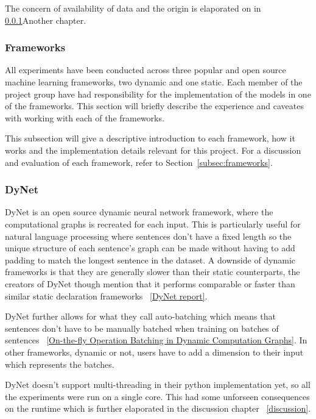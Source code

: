 The concern of availability of data and the origin is elaporated on in
\ref{}{Another chapter}.


\subsubsection{Frameworks}

All experiments have been conducted across three popular and open source machine
learning frameworks, two dynamic and one static. Each member of the project
group have had responsibility for the implementation of the models in one of the
frameworks. This section will briefly describe the experience and caveates with
working with each of the frameworks.

This subsection will give a descriptive introduction to each framework, how it
works and the implementation details relevant for this project. For a discussion
and evaluation of each framework, refer to Section~\ref{subsec:frameworks}.


\subsubsection*{DyNet}

DyNet is an open source dynamic neural network framework, where the
computational graphs is recreated for each input. This is particularly useful
for natural language processing where sentences don't have a fixed length so the
unique structure of each sentence's graph can be made without having to add
padding to match the longest sentence in the dataset. A downside of dynamic
frameworks is that they are generally slower than their static counterparts,
the creators of DyNet though mention that it performs comparable or faster than
similar static declaration frameworks ~\ref{DyNet report}.   

DyNet further allows for what they call auto-batching which means that sentences
don't have to be manually batched when training on batches of sentences
~\ref{On-the-fly Operation Batching in Dynamic Computation Graphs}. In other
frameworks, dynamic or not, users have to add a dimension to their input which
represents the batches.

DyNet doesn't support multi-threading in their python implementation yet, so all
the experiments were run on a single core. This had some unforseen consequences
on the runtime which is further elaporated in the discussion chapter
~\ref{discussion}.

